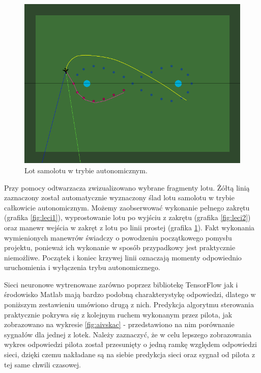 \documentclass[12pt, a4paper]{article}
\begin{document}
 \begin{figure}[H]
    \centering
    \includegraphics[width=1\textwidth]{aileci3}
    \caption{Lot samolotu w trybie autonomicznym.}
    \label{fig:leci3}
\end{figure}

Przy pomocy odtwarzacza zwizualizowano wybrane fragmenty lotu. Żółtą linią zaznaczony został automatycznie wyznaczony ślad lotu samolotu w trybie całkowicie autonomicznym. Możemy zaobserwować wykonanie pełnego zakrętu (grafika \ref{fig:leci1}), wyprostowanie lotu po wyjściu z zakrętu (grafika \ref{fig:leci2}) oraz manewr wejścia w zakręt z lotu po linii prostej (grafika \ref{fig:leci3}). Fakt wykonania wymienionych manewrów świadczy o powodzeniu początkowego pomysłu projektu, ponieważ ich wykonanie w sposób przypadkowy jest praktycznie niemożliwe. Początek i koniec krzywej linii oznaczają momenty odpowiednio uruchomienia i wyłączenia trybu autonomicznego. 

Sieci neuronowe wytrenowane zarówno poprzez bibliotekę TensorFlow jak i środowisko Matlab mają bardzo podobną charakterystykę odpowiedzi, dlatego w poniższym zestawieniu umówiono drugą z nich. Predykcja algorytmu sterowania praktycznie pokrywa się z kolejnym ruchem wykonanym przez pilota, jak zobrazowano na wykresie \ref{fig:aivskac} - przedstawiono na nim porównanie sygnałów dla jednej z lotek. Należy zaznaczyć, że w celu lepszego zobrazowania wykres odpowiedzi pilota został przesunięty o jedną ramkę względem odpowiedzi sieci, dzięki czemu nakładane są na siebie predykcja sieci oraz sygnał od pilota z tej same chwili czasowej.
\end{document}
